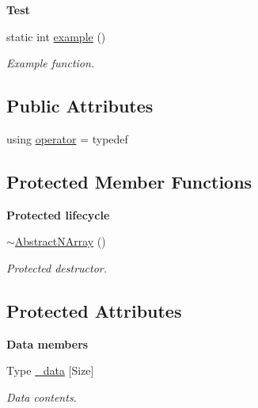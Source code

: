 \begin{Indent}{\bf Test}\par
\begin{DoxyCompactItemize}
\item 
static int \hyperlink{classmagrathea_1_1AbstractNArray_a6b7fb6f428ef9b21d0eac659fc66c428}{example} ()
\begin{DoxyCompactList}\small\item\em Example function. \end{DoxyCompactList}\end{DoxyCompactItemize}
\end{Indent}
\subsection*{Public Attributes}
\begin{DoxyCompactItemize}
\item 
using \hyperlink{classmagrathea_1_1AbstractNArray_ab941e2df51c9f6fe2d16cfc9a8178df9}{operator} = typedef
\end{DoxyCompactItemize}
\subsection*{Protected Member Functions}
\begin{Indent}{\bf Protected lifecycle}\par
\begin{DoxyCompactItemize}
\item 
\hyperlink{classmagrathea_1_1AbstractNArray_af72664598f77c92a422607991ff73423}{$\sim$\-Abstract\-N\-Array} ()
\begin{DoxyCompactList}\small\item\em Protected destructor. \end{DoxyCompactList}\end{DoxyCompactItemize}
\end{Indent}
\subsection*{Protected Attributes}
\begin{Indent}{\bf Data members}\par
\begin{DoxyCompactItemize}
\item 
Type \hyperlink{classmagrathea_1_1AbstractNArray_a236c5f0a521ae3108e6e7754a1fe28c5}{\-\_\-data} \mbox{[}Size\mbox{]}
\begin{DoxyCompactList}\small\item\em Data contents. \end{DoxyCompactList}\end{DoxyCompactItemize}
\end{Indent}


